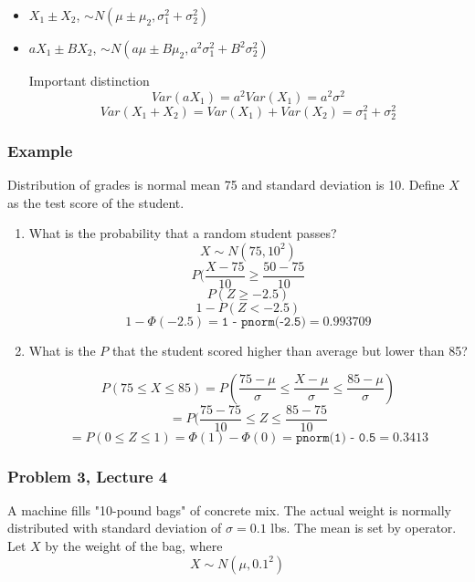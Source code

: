 \documentclass{report}
\newcommand{\var}{\sigma^2}
\begin{document}
\begin{itemize}
\item $X_1 \pm X_2$, $ \sim N(\mu \pm \mu_2, \var_1 + \var_2)$
\item $aX_1 \pm BX_2$, $ \sim N(a\mu \pm B\mu_2, a^2\var_1 + B^2\var_2)$

Important distinction $$Var(aX_1) = a^2 Var(X_1) = a^2 \var$$ $$Var(X_1 + X_2) = Var(X_1) + Var(X_2) = \var_1 + \var_2 $$
\end{itemize}

\subsubsection*{Example}

Distribution of grades is normal mean 75 and standard deviation is 10. Define $X$ as the test score of the student.

\begin{enumerate}
\item What is the probability that a random student passes? $$X \sim N(75, 10^2) $$ $$ P( \frac{X-75}{10} \geq \frac{50-75}{10} $$ $$ P(Z \geq -2.5) $$ $$ 1- P(Z < -2.5) $$ $$ 1-\Phi(-2.5) = \texttt{1 - pnorm(-2.5)} = 0.993709 $$

\item What is the $P$ that the student scored higher than average but lower than 85?

$$ P(75 \leq X \leq 85) = P(\frac{75-\mu}{\sigma} \leq \frac{X-\mu}{\sigma} \leq \frac{85-\mu}{\sigma} ) $$
$$ = P(\frac{75-75}{10} \leq Z \leq \frac{85-75}{10}  $$ $$ = P(0 \leq Z \leq 1) = \Phi(1) - \Phi(0) = \texttt{pnorm(1) - 0.5} = 0.3413  $$

\end{enumerate}
\subsubsection*{Problem 3, Lecture 4}

A machine fills "10-pound bags" of concrete mix. The actual weight is normally distributed with standard deviation of $\sigma = 0.1$ lbs. The mean is set by operator. Let $X$ by the weight of the bag, where $$X \sim N(\mu, 0.1^2)$$
\end{document}
